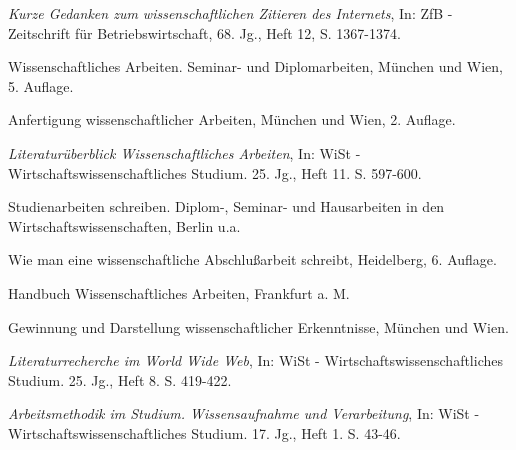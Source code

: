 \documentclass[a4paper, 12pt]{article}
\begin{document}
\newpage
\begin{thebibliography}{}

\singlespacing
{} \emph{Kurze Gedanken zum wissenschaftlichen Zitieren des Internets},
In: ZfB - Zeitschrift f\"{u}r Betriebswirtschaft, 68. Jg., Heft 12, S. 1367-1374.

 Wissenschaftliches Arbeiten. Seminar- und Diplomarbeiten, M\"{u}nchen
und Wien, 5. Auflage.

 Anfertigung wissenschaftlicher Arbeiten,
M\"{u}nchen und Wien, 2. Auflage.

 \emph{Literatur\"{u}berblick Wissenschaftliches Arbeiten},  In: WiSt
- Wirtschaftswissenschaftliches Studium. 25. Jg., Heft 11. S. 597-600.

 Studienarbeiten schreiben. Diplom-, Seminar- und Hausarbeiten
in den Wirtschaftswissenschaften, Berlin u.a.

 Wie man eine wissenschaftliche Abschlu\ss arbeit schreibt, Heidelberg,
6. Auflage.

 Handbuch Wissenschaftliches Arbeiten, Frankfurt a. M.

 Gewinnung und Darstellung wissenschaftlicher Erkenntnisse,
M\"{u}nchen und Wien.


 \emph{Literaturrecherche im World Wide
Web}, In: WiSt - Wirtschaftswissenschaftliches Studium. 25. Jg., Heft 8. S. 419-422.

 \emph{Arbeitsmethodik im Studium. Wissensaufnahme und Verarbeitung},
In: WiSt - Wirtschaftswissenschaftliches Studium. 17. Jg., Heft 1. S. 43-46.


\end{thebibliography}
\end{document}
